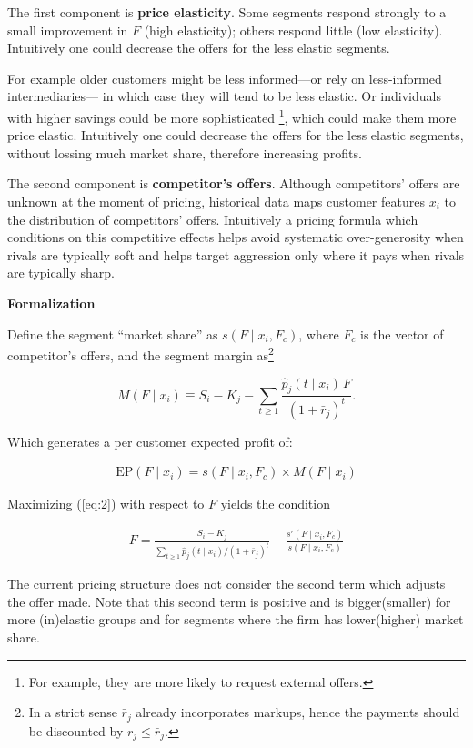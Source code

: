 \documentclass[12pt]{article}
\theoremstyle{plain}
\theoremstyle{plain}
\begin{document}
The first component is \textbf{price elasticity}. Some segments respond strongly to a small improvement in $F$ (high elasticity); others respond little (low elasticity). Intuitively one could decrease the offers for the less elastic segments. 

For example older customers might be less informed—or rely on less-informed intermediaries— in which case they will tend to be less elastic. Or individuals with higher savings could be more sophisticated \footnote{For example, they are more likely to request external offers.}, which could make them more price elastic. Intuitively one could decrease the offers for the less elastic segments, without lossing much market share, therefore increasing profits. 

The second component is \textbf{ competitor's offers}.  Although competitors’ offers are unknown at the moment of pricing, historical data maps customer features $x_i$ to the distribution of competitors' offers. Intuitively a pricing formula which conditions on this competitive effects  helps avoid systematic over-generosity when rivals are typically soft and helps target aggression only where it pays when rivals are typically sharp.


\vspace{.5cm}

\textbf{Formalization}

Define the segment “market share” as $s(F\mid x_i, F_c)$, where $F_c$ is the vector of competitor's offers, and  the segment margin as\footnote{In a strict sense $\bar{r}_j$ already incorporates markups, hence the payments should be discounted by $r_j\leq \bar{r}_j$.}

$$
M(F\mid x_i) \equiv S_i - K_j - \sum_{t\ge 1}\frac{\hat{p}_j(t\mid x_i)\,F}{(1+\bar{r}_j)^t}.
$$

Which generates a per customer expected profit of: 

\begin{align}\label{eq:2}
    \text{EP}(F\mid x_i)= s(F\mid x_i, F_c)\times M(F\mid x_i)
\end{align}

Maximizing (\ref{eq:2}) with respect to $F$ yields the condition

\begin{align}\label{eq:3}
    F = \frac{S_i - K_j}{\sum_{t\ge 1}\hat{p}_j(t\mid x_i)/(1+\bar{r}_j)^t}  
     -\frac{s'(F\mid x_i, F_c)}{s(F\mid x_i, F_c)}
\end{align}

The current pricing structure does not consider the second term which adjusts the offer made. Note that this second term is positive and is bigger(smaller) for more (in)elastic groups and for segments where the firm has lower(higher) market share. 
\end{document}

